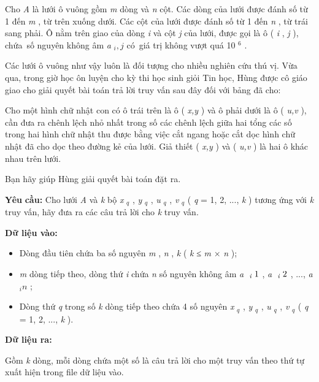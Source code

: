

Cho \emph{ A } là lưới ô vuông gồm \emph{ m } dòng và \emph{ n } cột. Các dòng của lưới được đánh số từ 1 đến \emph{ m } , từ trên xuống dưới. Các cột của lưới được đánh số từ 1 đến \emph{ n } , từ trái sang phải. Ô nằm trên giao của dòng \emph{ i } và cột \emph{ j } của lưới, được gọi là ô ( \emph{ i } , \emph{ j } ), chứa số nguyên không âm \emph{ a }\emph{$_ i,j $} có giá trị không vượt quá 10 $^ 6 $ .

Các lưới ô vuông như vậy luôn là đối tượng cho nhiều nghiên cứu thú vị. Vừa qua, trong giờ học ôn luyện cho kỳ thi học sinh giỏi Tin học, Hùng được cô giáo giao cho giải quyết bài toán trả lời truy vấn sau đây đối với bảng đã cho:

Cho một hình chữ nhật con có ô trái trên là ô ( \emph{ x,y } ) và ô phải dưới là ô ( \emph{ u,v } ), cần đưa ra chênh lệch nhỏ nhất trong số các chênh lệch giữa hai tổng các số trong hai hình chữ nhật thu được bằng việc cắt ngang hoặc cắt dọc hình chữ nhật đã cho dọc theo đường kẻ của lưới. Giả thiết ( \emph{ x,y } ) và ( \emph{ u,v } ) là hai ô khác nhau trên lưới.

Bạn hãy giúp Hùng giải quyết bài toán đặt ra.

\textbf{Yêu }\textbf{}\textbf{ cầu: }\textbf{} Cho lưới \emph{ A } và \emph{ k } bộ \emph{ x }\emph{$_ q $} , \emph{ y }\emph{$_ q $}\emph{} , \emph{ u }\emph{$_ q $} , \emph{ v }\emph{$_ q $}\emph{} ( \emph{ q }\emph{} = 1, 2, ..., \emph{ k } ) tương ứng với \emph{ k } truy vấn, hãy đưa ra các câu trả lời cho \emph{ k } truy vấn.

\textbf{Dữ liệu vào: }
\begin{itemize}
	\item Dòng đầu tiên chứa ba số nguyên \emph{ m } , \emph{ n } , \emph{ k } ( \emph{ k } ≤ \emph{ m } × \emph{ n } );
	\item \emph{m } dòng tiếp theo, dòng thứ \emph{ i } chứa \emph{ n } số nguyên không âm \emph{ a }$_\emph{ i } 1 $ , \emph{ a }$_\emph{ i } 2 $ , ..., \emph{ a }\emph{$_ in $} ;
	\item Dòng thứ \emph{ q } trong số \emph{ k } dòng tiếp theo chứa 4 số nguyên \emph{ x }\emph{$_ q $} , \emph{ y }\emph{$_ q $} , \emph{ u }\emph{$_ q $} , \emph{ v }\emph{$_ q $}\emph{} ( \emph{ q }\emph{} = 1, 2, ..., \emph{ k } ).
\end{itemize}

\textbf{Dữ liệu ra: }

Gồm \emph{ k } dòng, mỗi dòng chứa một số là câu trả lời cho một truy vấn theo thứ tự xuất hiện trong file dữ liệu vào.

